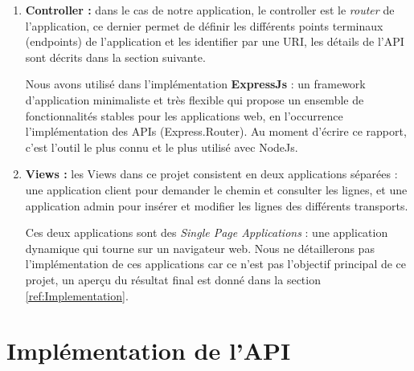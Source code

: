 \begin{enumerate}
	\item \textbf{Controller :} dans le cas de notre application, le controller est le \emph{router} de l'application, ce dernier permet de définir les différents points terminaux (endpoints) de l'application et les identifier par une URI, les détails de l'API sont décrits dans la section suivante.
	      
	      Nous avons utilisé dans l'implémentation \textbf{ExpressJs} : un framework d'application minimaliste et très flexible qui propose un ensemble de fonctionnalités stables pour les applications web, en l'occurrence l'implémentation des APIs (Express.Router). Au moment d'écrire ce rapport, c'est l'outil le plus connu et le plus utilisé avec NodeJs.
	      	
	\item \textbf{Views :} les Views dans ce projet consistent en deux applications séparées : une application client pour demander le chemin et consulter les lignes, et une application admin pour insérer et modifier les lignes des différents transports.
	      
	      Ces deux applications sont des \emph{Single Page Applications} : une application dynamique qui tourne sur un navigateur web.
	      Nous ne détaillerons pas l'implémentation de ces applications car ce n'est pas l'objectif principal de ce projet, un aperçu du résultat final est donné dans la section \ref{ref:Implementation}.
\end{enumerate}
	
	
	
\section{Implémentation de l'API}
\label{ref:API}
